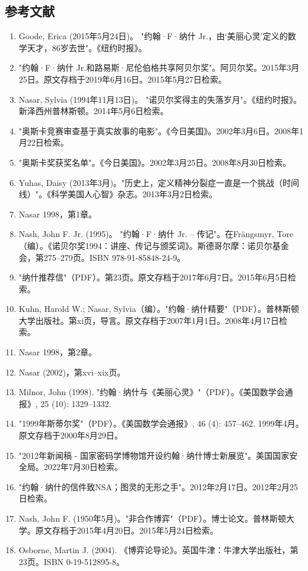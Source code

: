 \subsection{参考文献}  
\begin{enumerate}
\item Goode, Erica (2015年5月24日)。 "约翰·F·纳什 Jr.，由‘美丽心灵’定义的数学天才，86岁去世"。《纽约时报》。
\item "约翰·F·纳什 Jr.和路易斯·尼伦伯格共享阿贝尔奖"。阿贝尔奖。2015年3月25日。原文存档于2019年6月16日。2015年5月27日检索。
\item Nasar, Sylvia (1994年11月13日)。 "诺贝尔奖得主的失落岁月"。《纽约时报》。新泽西州普林斯顿。2014年5月6日检索。
\item "奥斯卡竞赛审查基于真实故事的电影"。《今日美国》。2002年3月6日。2008年1月22日检索。
\item "奥斯卡奖获奖名单"。《今日美国》。2002年3月25日。2008年8月30日检索。
\item Yuhas, Daisy (2013年3月)。"历史上，定义精神分裂症一直是一个挑战（时间线）"。《科学美国人心智》杂志。2013年3月2日检索。
\item Nasar 1998，第1章。
\item Nash, John F. Jr. (1995)。 "约翰·F·纳什 Jr. – 传记"。在Frängsmyr, Tore（编）。《诺贝尔奖1994：讲座、传记与颁奖词》。斯德哥尔摩：诺贝尔基金会，第275–279页。ISBN 978-91-85848-24-9。
\item "纳什推荐信"（PDF）。第23页。原文存档于2017年6月7日。2015年6月5日检索。
\item Kuhn, Harold W.; Nasar, Sylvia（编）。"约翰·纳什精要"（PDF）。普林斯顿大学出版社。第xi页，导言。原文存档于2007年1月1日。2008年4月17日检索。
\item Nasar 1998，第2章。
\item Nasar (2002)，第xvi–xix页。
\item Milnor, John (1998). "约翰·纳什与《美丽心灵》"（PDF）。《美国数学会通报》, 25 (10): 1329–1332.
\item "1999年斯蒂尔奖"（PDF）。《美国数学会通报》, 46 (4): 457–462. 1999年4月。原文存档于2000年8月29日。
\item "2012年新闻稿 - 国家密码学博物馆开设约翰·纳什博士新展览"。美国国家安全局。2022年7月30日检索。
\item "约翰·纳什的信件致NSA；图灵的无形之手"。2012年2月17日。2012年2月25日检索。
\item Nash, John F. (1950年5月)。"非合作博弈"（PDF）。博士论文。普林斯顿大学。原文存档于2015年4月20日。2015年5月24日检索。
\item Osborne, Martin J. (2004). 《博弈论导论》。英国牛津：牛津大学出版社，第23页。ISBN 0-19-512895-8。

\end{enumerate}
